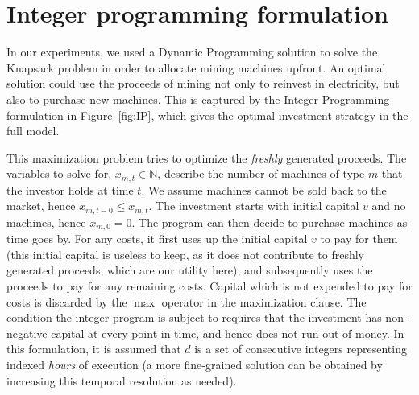 \section{Integer programming formulation}\label{sec:ip}

In our experiments, we used a Dynamic Programming solution to solve the Knapsack
problem in order to allocate mining machines upfront. An optimal solution could
use the proceeds of mining not only to reinvest in electricity, but also to
purchase new machines. This is captured by the Integer Programming
formulation in Figure~\ref{fig:IP}, which gives the optimal investment strategy
in the full model.

This maximization problem tries to optimize the \emph{freshly} generated
proceeds. The variables to solve for, $x_{m,t} \in \mathbb{N}$, describe the
number of machines of type $m$ that the investor holds at time $t$. We assume
machines cannot be sold back to the market, hence $x_{m,t-0} \leq x_{m,t}$. The
investment starts with initial capital $v$ and no machines, hence $x_{m,0} = 0$.
The program can then decide to purchase machines as time goes by.
For any costs, it first uses up the initial capital $v$ to pay for
them (this initial capital is useless to keep, as it does not contribute to
freshly generated proceeds, which are our utility here), and subsequently uses
the proceeds to pay for any remaining costs. Capital which is not expended to
pay for costs is discarded by the $\max$ operator in the maximization clause.
The condition the integer program is subject to requires that the investment has
non-negative capital at every point in time, and hence does not run out of
money. In this formulation, it is assumed that $d$ is a set of consecutive
integers representing indexed \emph{hours} of execution (a more fine-grained
solution can be obtained by increasing this temporal resolution as needed).

